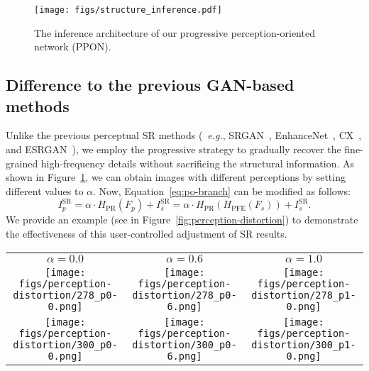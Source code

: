 \documentclass[preprint]{elsarticle}
\newcommand{\eg}{\textit{e.g.}}
\begin{document}
\begin{figure}[htpb]
	\begin{center}
		\texttt{[image: figs/structure\_inference.pdf]}
	\end{center}
	\caption{The inference architecture of our progressive perception-oriented network (PPON).}
	\label{fig:inference-architecture}
\end{figure}



\subsection{Difference to the previous GAN-based methods}
Unlike the previous perceptual SR methods (~\eg, SRGAN~\cite{SRGAN}, EnhanceNet~\cite{EnhanceNet}, CX~\cite{CX}, and ESRGAN~\cite{ESRGAN}), we employ the progressive strategy to gradually recover the fine-grained high-frequency details without sacrificing the structural information. As shown in Figure~\ref{fig:inference-architecture}, we can obtain images with different perceptions by setting different values to $\alpha $. Now, Equation~\ref{eq:po-branch} can be modified as follows:
\begin{equation}
I_p^\text{SR} = \alpha \cdot{H_\text{PR}}\left( {{F_p}} \right) + I_s^\text{SR} = \alpha \cdot{H_\text{PR}}\left( {{H_\text{PFE}}\left( {{F_s}} \right)} \right) + I_s^\text{SR}.
\end{equation}
We provide an example (see in Figure~\ref{fig:perception-distortion}) to demonstrate the effectiveness of this user-controlled adjustment of SR results.


\begin{figure*}[htpb]
	\centering
	\begin{tabular}{ccc}
		$\alpha  = 0.0$ & $\alpha  = 0.6$ & $\alpha  = 1.0$ \\		\texttt{[image: figs/perception-distortion/278\_p0-0.png]} &
		\hspace{-4mm}
		\texttt{[image: figs/perception-distortion/278\_p0-6.png]} &
		\hspace{-4mm}
		\texttt{[image: figs/perception-distortion/278\_p1-0.png]} \\
		
		\texttt{[image: figs/perception-distortion/300\_p0-0.png]} &
		\hspace{-4mm}
		\texttt{[image: figs/perception-distortion/300\_p0-6.png]} &
		\hspace{-4mm}
		\texttt{[image: figs/perception-distortion/300\_p1-0.png]} \\
		
	\end{tabular}
	\caption{The perception-distortion trade-off. In the first column, $\alpha  = 0.0$ directly denotes the outputs of SOBranch. Equally, $\alpha  = 1.0$ indicates the results (without any discount) of POBranch. \textbf{Best viewed with zoom-in.}}
	\label{fig:perception-distortion}
\end{figure*}
\end{document}
